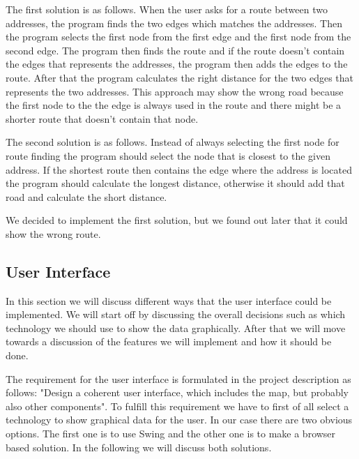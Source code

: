 \documentclass[a4paper,10pt,titlepage]{article}
\begin{document}
The first solution is as follows. When the user asks for a route between two addresses, the program finds the two edges which matches the addresses. Then the program selects the first node from the first edge and the first node from the second edge. The program then finds the route and if the route doesn't contain the edges that represents the addresses, the program then adds the edges to the route. After that the program calculates the right distance for the two edges that represents the two addresses.  This approach may show the wrong road because the first node to the the edge is always used in the route and there might be a shorter route that doesn't contain that node. 

The second solution is as follows. Instead of always selecting the first node for route finding the program should select the node that is closest to the given address. If the shortest route then contains the edge where the address is located the program should calculate the longest distance, otherwise it should add that road and calculate the short distance.

We decided to implement the first solution, but we found out later that it could show the wrong route. 


			\newpage
			\subsection{User Interface}

				In this section we will discuss different ways that the user interface could be implemented. We will start off by discussing the overall decisions such as which technology we should use to show the data graphically. After that we will move towards a discussion of the features we will implement and how it should be done.  

The requirement for the user interface is formulated in the project description as follows: "Design a coherent user interface, which includes the map, but probably also other components". To fulfill this requirement we have to first of all select a technology to show graphical data for the user. In our case there are two obvious options. The first one is to use Swing and the other one is to make a browser based solution. In the following we will discuss both solutions.
\end{document}
